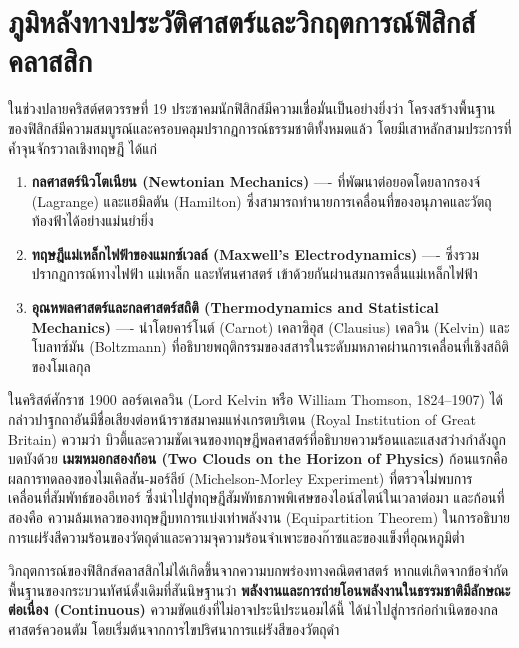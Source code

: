 \newpage
\section{ภูมิหลังทางประวัติศาสตร์และวิกฤตการณ์ฟิสิกส์คลาสสิก}

ในช่วงปลายคริสต์ศตวรรษที่ 19 ประชาคมนักฟิสิกส์มีความเชื่อมั่นเป็นอย่างยิ่งว่า โครงสร้างพื้นฐานของฟิสิกส์มีความสมบูรณ์และครอบคลุมปรากฏการณ์ธรรมชาติทั้งหมดแล้ว โดยมีเสาหลักสามประการที่ค้ำจุนจักรวาลเชิงทฤษฎี ได้แก่

\begin{enumerate}
    \item \textbf{กลศาสตร์นิวโตเนียน (Newtonian Mechanics)} ---- ที่พัฒนาต่อยอดโดยลากรองจ์ (Lagrange) และแฮมิลตัน (Hamilton) ซึ่งสามารถทำนายการเคลื่อนที่ของอนุภาคและวัตถุท้องฟ้าได้อย่างแม่นยำยิ่ง
    \item \textbf{ทฤษฎีแม่เหล็กไฟฟ้าของแมกซ์เวลล์ (Maxwell's Electrodynamics)} ---- ซึ่งรวมปรากฏการณ์ทางไฟฟ้า แม่เหล็ก และทัศนศาสตร์ เข้าด้วยกันผ่านสมการคลื่นแม่เหล็กไฟฟ้า
    \item \textbf{อุณหพลศาสตร์และกลศาสตร์สถิติ (Thermodynamics and Statistical Mechanics)} ---- นำโดยคาร์โนต์ (Carnot) เคลาซิอุส (Clausius) เคลวิน (Kelvin) และโบลทซ์มัน (Boltzmann) ที่อธิบายพฤติกรรมของสสารในระดับมหภาคผ่านการเคลื่อนที่เชิงสถิติของโมเลกุล
\end{enumerate}

ในคริสต์ศักราช 1900 ลอร์ดเคลวิน (Lord Kelvin หรือ William Thomson, 1824--1907) ได้กล่าวปาฐกถาอันมีชื่อเสียงต่อหน้าราชสมาคมแห่งเกรตบริเตน (Royal Institution of Great Britain) ความว่า บิวตี้และความชัดเจนของทฤษฎีพลศาสตร์ที่อธิบายความร้อนและแสงสว่างกำลังถูกบดบังด้วย \textbf{เมฆหมอกสองก้อน (Two Clouds on the Horizon of Physics)} ก้อนแรกคือ ผลการทดลองของไมเคิลสัน-มอร์ลีย์ (Michelson-Morley Experiment) ที่ตรวจไม่พบการเคลื่อนที่สัมพัทธ์ของอีเทอร์ ซึ่งนำไปสู่ทฤษฎีสัมพัทธภาพพิเศษของไอน์สไตน์ในเวลาต่อมา และก้อนที่สองคือ ความล้มเหลวของทฤษฎีบทการแบ่งเท่าพลังงาน (Equipartition Theorem) ในการอธิบายการแผ่รังสีความร้อนของวัตถุดำและความจุความร้อนจำเพาะของก๊าซและของแข็งที่อุณหภูมิต่ำ

วิกฤตการณ์ของฟิสิกส์คลาสสิกไม่ได้เกิดขึ้นจากความบกพร่องทางคณิตศาสตร์ หากแต่เกิดจากข้อจำกัดพื้นฐานของกระบวนทัศน์ดั้งเดิมที่สันนิษฐานว่า \textbf{พลังงานและการถ่ายโอนพลังงานในธรรมชาติมีลักษณะต่อเนื่อง (Continuous)} ความขัดแย้งที่ไม่อาจประนีประนอมได้นี้ ได้นำไปสู่การก่อกำเนิดของกลศาสตร์ควอนตัม โดยเริ่มต้นจากการไขปริศนาการแผ่รังสีของวัตถุดำ

